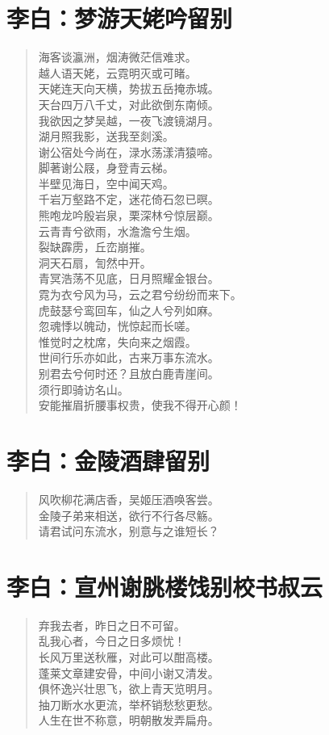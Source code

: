 \documentclass[12pt,oneside]{book}
\newenvironment{shici}{%
\begin{verse}\centering\yanti\large\hspace{12pt}}{\end{verse}}
\begin{document}
\begin{common-format}
\chapter{李白：梦游天姥吟留别}
\begin{shici}
海客谈瀛洲，烟涛微茫信难求。\\
越人语天姥，云霓明灭或可睹。\\
天姥连天向天横，势拔五岳掩赤城。\\
天台四万八千丈，对此欲倒东南倾。\\
我欲因之梦吴越，一夜飞渡镜湖月。\\
湖月照我影，送我至剡溪。\\
谢公宿处今尚在，渌水荡漾清猿啼。\\
脚著谢公屐，身登青云梯。\\
半壁见海日，空中闻天鸡。\\
千岩万壑路不定，迷花倚石忽已暝。\\
熊咆龙吟殷岩泉，栗深林兮惊层巅。\\
云青青兮欲雨，水澹澹兮生烟。\\
裂缺霹雳，丘峦崩摧。\\
洞天石扇，訇然中开。\\
青冥浩荡不见底，日月照耀金银台。\\
霓为衣兮风为马，云之君兮纷纷而来下。\\
虎鼓瑟兮鸾回车，仙之人兮列如麻。\\
忽魂悸以魄动，恍惊起而长嗟。\\
惟觉时之枕席，失向来之烟霞。\\
世间行乐亦如此，古来万事东流水。\\
别君去兮何时还？且放白鹿青崖间。\\
须行即骑访名山。\\
安能摧眉折腰事权贵，使我不得开心颜！
\end{shici}

\chapter{李白：金陵酒肆留别}
\begin{shici}
风吹柳花满店香，吴姬压酒唤客尝。\\
金陵子弟来相送，欲行不行各尽觞。\\
请君试问东流水，别意与之谁短长？
\end{shici}

\chapter{李白：宣州谢朓楼饯别校书叔云}
\begin{shici}
弃我去者，昨日之日不可留。\\
乱我心者，今日之日多烦忧！\\
长风万里送秋雁，对此可以酣高楼。\\
蓬莱文章建安骨，中间小谢又清发。\\
俱怀逸兴壮思飞，欲上青天览明月。\\
抽刀断水水更流，举杯销愁愁更愁。\\
人生在世不称意，明朝散发弄扁舟。
\end{shici}


\end{common-format}
\end{document}
